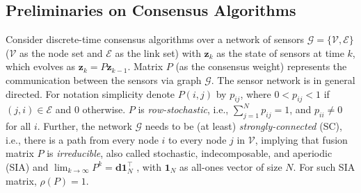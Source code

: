 \documentclass[journal]{IEEEtran}
\newcommand{\tb}{\color{blue}}
\def\mb{\mathbf}
\def\mc{\mathcal}
\begin{document}
\subsection{Preliminaries on Consensus Algorithms} \label{sec_pre}
Consider discrete-time consensus algorithms over a network of sensors $\mc{G}=\{\mc{V},\mc{E}\}$ ($\mc{V}$ as the node set and $\mc{E}$ as the link set) with $\mb{z}_{k}$ as the state of  sensors at time $k$, which evolves as $\mb{z}_{k} = P \mb{z}_{k-1}$. Matrix $P$ (as the consensus weight) represents the communication between the sensors via graph $\mathcal{G}$. 
The sensor network is in general directed. For notation simplicity denote $P(i,j)$ by $p_{ij}$, where $0<p_{ij}<1$ if $(j,i) \in \mc{E}$ and $0$ otherwise. $P$  is \textit{row-stochastic}, i.e., $\sum_{j=1}^N p_{ij} = 1$, and $p_{ii} \neq 0$ for all $i$. Further,  the network $\mc{G}$ needs to be (at least) \textit{strongly-connected} (SC), i.e., there is a path from every node $i$ to every node $j$ in $\mathcal{V}$, implying  that fusion matrix $P$ is \textit{irreducible}, also called stochastic, indecomposable, and aperiodic (SIA) and  $\lim_{k \rightarrow \infty} P^k = \mb{d}\mb{1}_N^\top 
$ \cite{Themis_delay}, with $\mathbf{1}_N$ as all-ones vector of size $N$. For such SIA matrix,  $\rho(P)=1$. 
 
\end{document}
